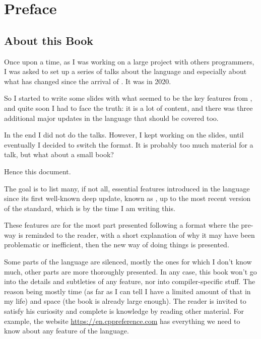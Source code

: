 \chapter{Preface}
\renewcommand*\thesection{\arabic{section}}

\section{About this Book}

Once upon a time, as I was working on a large project with others
\cpp{} programmers, I was asked to set up a series of talks about the
language and especially about what has changed since the arrival of
. It was in 2020.

So I started to write some slides with what seemed to be the key
features from , and quite soon I had to face the truth: it is a
lot of content, and there was three additional major updates in the
language that should be covered too.

In the end I did not do the talks. However, I kept working on the
slides, until eventually I decided to switch the format. It is
probably too much material for a talk, but what about a small book?

Hence this document.

\bigskip

The goal is to list many, if not all, essential features introduced in
the \cpp{} language since its first well-known deep update, known as
, up to the most recent version of the standard, which is 
by the time I am writing this.

These features are for the most part presented following a format
where the pre- way is reminded to the reader, with a short
explanation of why it may have been problematic or inefficient, then
the new way of doing things is presented.

Some parts of the language are silenced, mostly the ones for which I
don't know much, other parts are more thoroughly presented. In any
case, this book won't go into the details and subtleties of any
feature, nor into compiler-specific stuff. The reason being mostly
time (as far as I can tell I have a limited amount of that in my life)
and space (the book is already large enough). The reader is invited to
satisfy his curiosity and complete is knowledge by reading other
material. For example, the website \url{https://en.cppreference.com}
has everything we need to know about any feature of the language.

